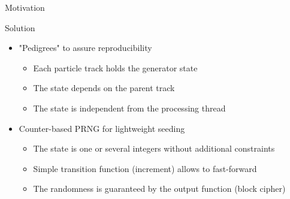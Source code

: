 \documentclass[aspectratio=169, 14pt]{beamer}
\begin{document}
\begin{large}
\begin{frame}{Motivation}
\begin{itemize}
  \end{itemize}

 \end{frame}

 
 \begin{frame}{Solution}
  \begin{itemize}
   \item "Pedigrees" to assure reproducibility
    \begin{itemize}
     \item Each particle track holds the generator state
     \item The state depends on the parent track
     \item The state is independent from the processing thread
    \end{itemize}
   \item Counter-based PRNG for lightweight seeding
    \begin{itemize}
     \item The state is one or several integers without additional constraints
     \item Simple transition function (increment) allows to fast-forward
     \item The randomness is guaranteed by the output function (block cipher)
    \end{itemize}
  \end{itemize}

 \end{frame}
 
 \end{large}
\end{document}
